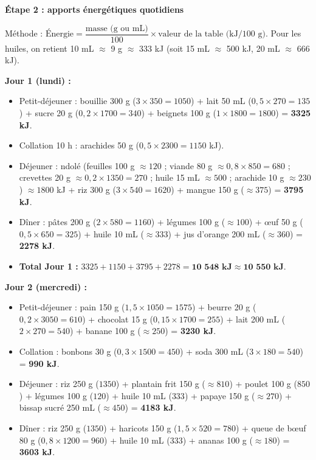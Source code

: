 \documentclass[11pt]{article}
\begin{document}
\begin{exoresolu}
\textbf{Étape 2 : apports énergétiques quotidiens}
\par
Méthode : $\text{Énergie} = \dfrac{\text{masse (g ou mL)}}{100} \times \text{valeur de la table (kJ/100 g)}$. Pour les huiles, on retient 10 mL $\approx$ 9 g $\approx$ 333 kJ (soit 15 mL $\approx$ 500 kJ, 20 mL $\approx$ 666 kJ).
\par
\textbf{Jour 1 (lundi) :}
\begin{itemize}
    \item Petit-déjeuner : bouillie 300 g ($3 \times 350 = 1050$) + lait 50 mL ($0,5 \times 270 = 135$) + sucre 20 g ($0,2 \times 1700 = 340$) + beignets 100 g ($1 \times 1800 = 1800$) = \textbf{3325 kJ}.
    \item Collation 10 h : arachides 50 g ($0,5 \times 2300 = 1150$ kJ).
    \item Déjeuner : ndolé (feuilles 100 g $\approx 120$ ; viande 80 g $\approx 0,8 \times 850 = 680$ ; crevettes 20 g $\approx 0,2 \times 1350 = 270$ ; huile 15 mL $\approx 500$ ; arachide 10 g $\approx 230$) $\approx 1800$ kJ + riz 300 g ($3 \times 540 = 1620$) + mangue 150 g ($\approx 375$) = \textbf{3795 kJ}.
    \item Dîner : pâtes 200 g ($2 \times 580 = 1160$) + légumes 100 g ($\approx 100$) + œuf 50 g ($0,5 \times 650 = 325$) + huile 10 mL ($\approx 333$) + jus d'orange 200 mL ($\approx 360$) = \textbf{2278 kJ}.
    \item \textbf{Total Jour 1 :} $3325 + 1150 + 3795 + 2278 = \textbf{10 548 kJ} \approx \textbf{10 550 kJ}$.
\end{itemize}
\par
\textbf{Jour 2 (mercredi) :}
\begin{itemize}
    \item Petit-déjeuner : pain 150 g ($1,5 \times 1050 = 1575$) + beurre 20 g ($0,2 \times 3050 = 610$) + chocolat 15 g ($0,15 \times 1700 = 255$) + lait 200 mL ($2 \times 270 = 540$) + banane 100 g ($\approx 250$) = \textbf{3230 kJ}.
    \item Collation : bonbons 30 g ($0,3 \times 1500 = 450$) + soda 300 mL ($3 \times 180 = 540$) = \textbf{990 kJ}.
    \item Déjeuner : riz 250 g ($1350$) + plantain frit 150 g ($\approx 810$) + poulet 100 g ($850$) + légumes 100 g ($120$) + huile 10 mL ($333$) + papaye 150 g ($\approx 270$) + bissap sucré 250 mL ($\approx 450$) = \textbf{4183 kJ}.
    \item Dîner : riz 250 g ($1350$) + haricots 150 g ($1,5 \times 520 = 780$) + queue de bœuf 80 g ($0,8 \times 1200 = 960$) + huile 10 mL ($333$) + ananas 100 g ($\approx 180$) = \textbf{3603 kJ}.

\end{itemize}
\end{exoresolu}
\end{document}
